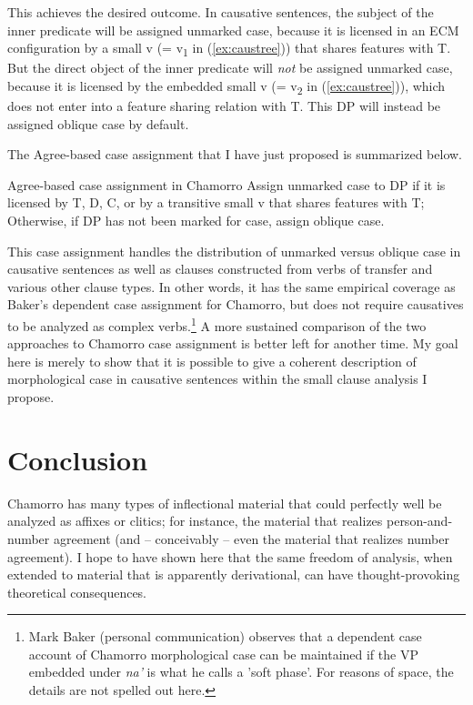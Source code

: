 \documentclass[output=paper,
modfonts
]{LSP/langsci}
\begin{document}
\begin{exe}
\begin{xlist}
This achieves the desired outcome. In causative sentences, the subject
of the inner predicate will be assigned unmarked case, because it is
licensed in an ECM configuration by a small v (= v\textsubscript{1} in
(\ref{ex:caustree})) that shares features with T. But the direct object of the inner
predicate will \emph{not} be assigned unmarked case, because it is
licensed by the embedded small v (= v\textsubscript{2} in (\ref{ex:caustree})), which
does not enter into a feature sharing relation with T. This DP will
instead be assigned oblique case by default.

The Agree-based case assignment that I have just proposed is summarized
below.

\ea Agree-based case assignment in Chamorro
	\ea Assign unmarked case to DP if it is licensed by T, D, C, or by a
transitive small v that shares features with T;
	\ex Otherwise, if DP has not been marked for case, assign oblique case.
	\z
\z

This case assignment handles the distribution of unmarked versus oblique
case in causative sentences as well as clauses constructed from verbs of
transfer and various other clause types. In other words, it has the same
empirical coverage as Baker's dependent case assignment for Chamorro,
but does not require causatives to be analyzed as complex
verbs.\footnote{Mark Baker (personal communication) observes that a
  dependent case account of Chamorro morphological case can be
  maintained if the VP embedded under \emph{na'} is what he calls a
  'soft phase'. For reasons of space, the details are not spelled out
  here.} A more sustained comparison of the two approaches to Chamorro
case assignment is better left for another time. My goal here is merely
to show that it is possible to give a coherent description of
morphological case in causative sentences within the small clause
analysis I propose.

\section{Conclusion}

Chamorro has many types of inflectional material that could perfectly
well be analyzed as affixes or clitics; for instance, the material that
realizes person-and-number agreement (and -- conceivably -- even the
material that realizes number agreement). I hope to have shown here that
the same freedom of analysis, when extended to material that is
apparently derivational, can have thought-provoking theoretical
consequences.




\end{xlist}
\end{exe}
\end{document}
